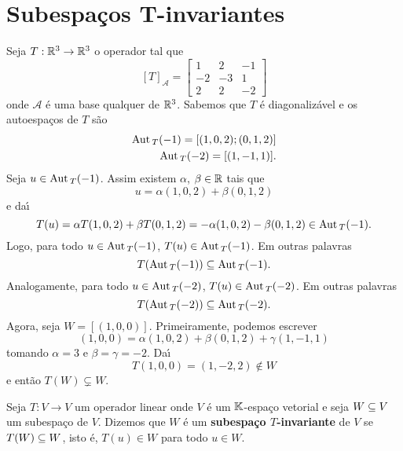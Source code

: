 \section{Subespa\c{c}os T-invariantes} %
\label{sec:subespacos_T-invariantes}
Seja $T : \mathbb{R}^3 \to \mathbb{R}^3$ o operador tal que
		\[
	[T]_\mathcal{A} = \begin{bmatrix}
			1 & 2 & -1\\
			-2 & -3 & 1\\
			2 & 2 & -2
		\end{bmatrix}
		\]
onde $\mathcal{A}$ \'e uma base qualquer de $\mathbb{R}^3$. Sabemos que $T$ \'e diagonaliz\'avel e os autoespa\c{c}os de $T$ s\~ao
\begin{align*}
	{\rm Aut\,}_T(-1) = [(1,0,2); (0,1,2)]\\
	{\rm Aut\,}_T(-2) = [(1,-1,1)].
\end{align*}
Seja $u \in {\rm Aut\,}_T(-1)$. Assim existem $\alpha$, $\beta \in \mathbb{R}$ tais que
\[
	u = \alpha(1,0,2) + \beta(0,1,2)
\]
e da{\'\i}
\[
	T(u) = \alpha T(1,0,2) + \beta T(0,1,2) = -\alpha(1,0,2) - \beta(0,1,2) \in {\rm Aut\,}_T(-1).
\]
Logo, para todo $u \in {\rm Aut\,}_T(-1)$, $T(u) \in {\rm Aut\,}_T(-1)$. Em outras palavras
\[
	T({\rm Aut\,}_T(-1)) \subseteq {\rm Aut\,}_T(-1).
\]
Analogamente, para todo $u \in {\rm Aut\,}_T(-2)$, $T(u) \in {\rm Aut\,}_T(-2)$. Em outras palavras
\[
	T({\rm Aut\,}_T(-2)) \subseteq {\rm Aut\,}_T(-2).
\]
Agora, seja $W = [(1,0,0)]$. Primeiramente, podemos escrever
\[
	(1,0,0) = \alpha(1,0,2) + \beta(0,1,2) + \gamma(1,-1,1)
\]
tomando $\alpha = 3$ e $\beta = \gamma = -2$. Da{\'\i}
\[
	T(1,0,0) = (1,-2,2) \notin W
\]
e ent\~ao $T(W) \varsubsetneq W$.

\begin{definicao}
	Seja $T : V \to V$ um operador linear onde $V$ \'e um $\mathbb{K}$-espa\c{c}o vetorial e seja $W \subseteq V$ um subespa\c{c}o de $V$. Dizemos que $W$ \'e um \textbf{subespa\c{c}o $T$-invariante} de $V$ se $T(W) \subseteq W$, isto \'e, $T(u) \in W$ para todo $u \in W$.
\end{definicao}

